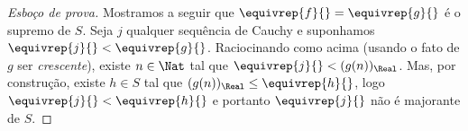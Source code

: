 \documentclass[../../../include/open-logic-section]{subfiles}
\begin{document}
\begin{proof}[Esboço de prova]
Mostramos a seguir que $\equivrep{f}{} = \equivrep{g}{}$ é o supremo de $S$. Seja
$j$ qualquer sequência de Cauchy e suponhamos $\equivrep{j}{} < \equivrep{g}{}$.
Raciocinando como acima (usando o fato de $g$ ser \emph{crescente}), existe
$n \in \Nat$ tal que $\equivrep{j}{} < (g(n))_\Real$. Mas, por construção, existe
$h \in S$ tal que $(g(n))_\Real \leq \equivrep{h}{}$, logo $\equivrep{j}{} <
\equivrep{h}{}$ e portanto $\equivrep{j}{}$ não é majorante de $S$.  
\end{proof}
\end{document}
